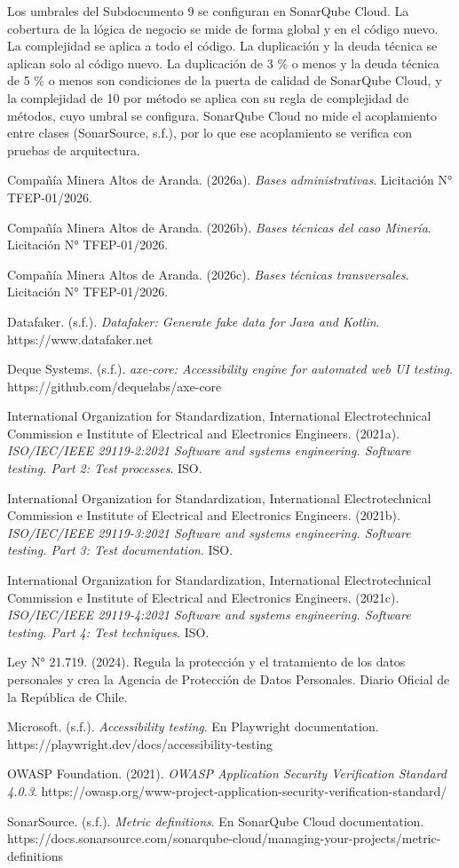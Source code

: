 \documentclass[formulario]{../../comun/overfore}
\begin{document}
Los umbrales del Subdocumento 9 se configuran en SonarQube Cloud. La cobertura de la lógica de negocio se mide de forma global y en el código nuevo. La complejidad se aplica a todo el código. La duplicación y la deuda técnica se aplican solo al código nuevo. La duplicación de 3 \% o menos y la deuda técnica de 5 \% o menos son condiciones de la puerta de calidad de SonarQube Cloud, y la complejidad de 10 por método se aplica con su regla de complejidad de métodos, cuyo umbral se configura. SonarQube Cloud no mide el acoplamiento entre clases (SonarSource, s.f.), por lo que ese acoplamiento se verifica con pruebas de arquitectura.

\begin{referencias}
\item Compañía Minera Altos de Aranda. (2026a). \emph{Bases administrativas}. Licitación N° TFEP-01/2026.
\item Compañía Minera Altos de Aranda. (2026b). \emph{Bases técnicas del caso Minería}. Licitación N° TFEP-01/2026.
\item Compañía Minera Altos de Aranda. (2026c). \emph{Bases técnicas transversales}. Licitación N° TFEP-01/2026.
\item Datafaker. (s.f.). \emph{Datafaker: Generate fake data for Java and Kotlin}. https://www.datafaker.net
\item Deque Systems. (s.f.). \emph{axe-core: Accessibility engine for automated web UI testing}. https://github.com/dequelabs/axe-core
\item International Organization for Standardization, International Electrotechnical Commission e Institute of Electrical and Electronics Engineers. (2021a). \emph{ISO/IEC/IEEE 29119-2:2021 Software and systems engineering. Software testing. Part 2: Test processes}. ISO.
\item International Organization for Standardization, International Electrotechnical Commission e Institute of Electrical and Electronics Engineers. (2021b). \emph{ISO/IEC/IEEE 29119-3:2021 Software and systems engineering. Software testing. Part 3: Test documentation}. ISO.
\item International Organization for Standardization, International Electrotechnical Commission e Institute of Electrical and Electronics Engineers. (2021c). \emph{ISO/IEC/IEEE 29119-4:2021 Software and systems engineering. Software testing. Part 4: Test techniques}. ISO.
\item Ley N° 21.719. (2024). Regula la protección y el tratamiento de los datos personales y crea la Agencia de Protección de Datos Personales. Diario Oficial de la República de Chile.
\item Microsoft. (s.f.). \emph{Accessibility testing}. En Playwright documentation. https://playwright.dev/docs/accessibility-testing
\item OWASP Foundation. (2021). \emph{OWASP Application Security Verification Standard 4.0.3}. https://owasp.org/www-project-application-security-verification-standard/
\item SonarSource. (s.f.). \emph{Metric definitions}. En SonarQube Cloud documentation. https://docs.sonarsource.com/sonarqube-cloud/managing-your-projects/metric-definitions
\end{referencias}
\end{document}
